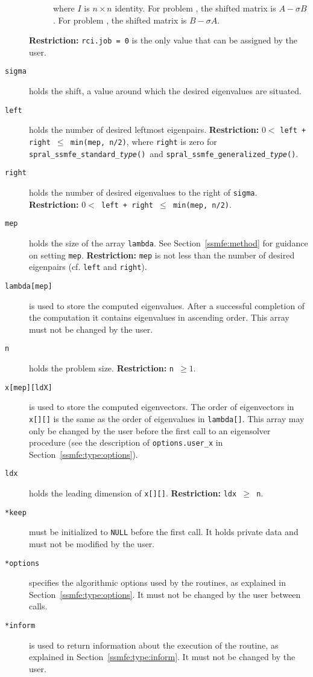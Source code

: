 \begin{description}
\begin{description}
where $I$ is $n\times n$ identity.
For problem , the shifted matrix is $A - \sigma B$.
For problem , the shifted matrix is $B - \sigma A$.
%
\end{description}
%
{\bf Restriction:} 
{\tt rci.job = 0} is the only value that can be assigned by the user.
%
\item[\texttt{sigma}] 
holds the shift, a value around which the desired eigenvalues are situated.
%
\item[\texttt{left}] holds the number of desired leftmost eigenpairs.
{\bf Restriction:} {$0 <$ \tt left + right $\le$ min(mep, n/2)},
where {\tt right} is zero for 
{\tt spral\_ssmfe\_standard\_\textit{type}()}\ and
{\tt spral\_ssmfe\_generalized\_\textit{type}()}.
%
\item[\texttt{right}] holds the number of desired eigenvalues to the right of {\tt sigma}.
{\bf Restriction:} {\tt $0 < $ left + right $\le$ min(mep, n/2)}.
%
\item[\texttt{mep}] holds the size of the array {\tt lambda}.
See Section~\ref{ssmfe:method} for guidance on
setting {\tt mep}.
{\bf Restriction:} 
{\tt mep} is not less than the number of desired eigenpairs
(cf. {\tt left} and {\tt right}).
%
\item[\texttt{lambda[mep]}] is
used to store the computed eigenvalues.
After a successful completion of the computation
it contains eigenvalues in ascending order.
This array must not be changed by the user.
%
\item[\texttt{n}] holds the problem size.
{\bf Restriction:} {\tt n $\ge 1$}.
%
\item[\texttt{x[mep][ldX]}] is
used to store the computed eigenvectors.
The order of eigenvectors in {\tt x[][]}
is the same as the order of eigenvalues in {\tt lambda[]}.
This array may only be changed by the user
before the first call to an eigensolver procedure
(see the description of {\tt options.user\_x} in Section~\ref{ssmfe:type:options}).
%
\item[\texttt{ldx}] holds the leading dimension of {\tt x[][]}.
{\bf Restriction:} {\tt ldx $\ge$ n}.
%
\item[\texttt{*keep}] must be initialized to \texttt{NULL} before the first call.
It holds private data and must not be modified by the user.
%
\item[\texttt{*options}] specifies the algorithmic options used by the routines,
as explained in Section~\ref{ssmfe:type:options}.
It must not be changed by the user between calls.
%
\item[\texttt{*inform}] is used to return information about the execution of the
routine, as explained in Section~\ref{ssmfe:type:inform}.
It must not be changed by the user.
%
\end{description}

